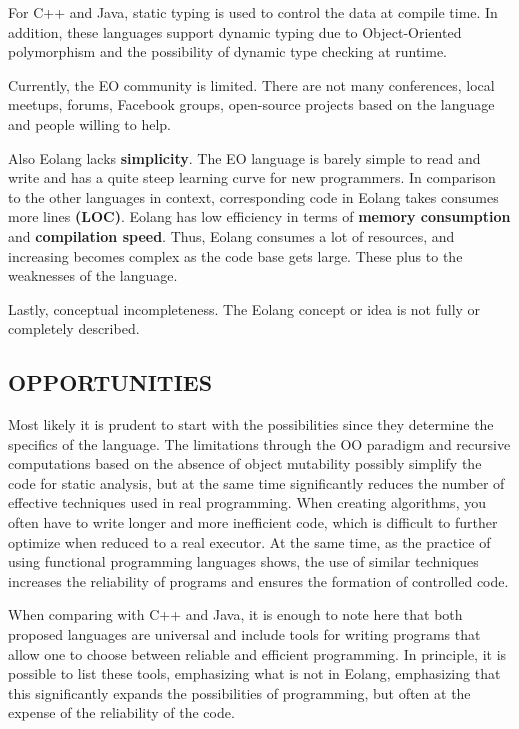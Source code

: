 \documentclass[12pt]{book}
\begin{document}
{{For C++ and Java, static typing is used to control the data at compile time. In addition, these languages support dynamic typing due to Object-Oriented polymorphism and the possibility of dynamic type checking at runtime.

Currently, the EO community is limited. There are not many conferences, local meetups, forums, Facebook groups, open-source projects based on the language and people willing to help. 

Also Eolang lacks \textbf{simplicity}. The EO language is barely simple to read and write and has a quite steep learning curve for new programmers. In comparison to the other languages in context, corresponding code in Eolang takes consumes more lines \textbf{(LOC)}. Eolang has low efficiency in terms of \textbf{memory consumption} and \textbf{compilation speed}. Thus, Eolang consumes a lot of resources, and increasing becomes complex as the code base gets large. These plus to the weaknesses of the language.

Lastly, conceptual incompleteness. The Eolang concept or idea is not fully or completely described.

\subsection{OPPORTUNITIES}
Most likely it is prudent to start with the possibilities since they determine the specifics of the language. The limitations through the OO paradigm and recursive computations based on the absence of object mutability possibly simplify the code for static analysis, but at the same time significantly reduces the number of effective techniques used in real programming. When creating algorithms, you often have to write longer and more inefficient code, which is difficult to further optimize when reduced to a real executor. At the same time, as the practice of using functional programming languages shows, the use of similar techniques increases the reliability of programs and ensures the formation of controlled code.

When comparing with C++ and Java, it is enough to note here that both proposed languages are universal and include tools for writing programs that allow one to choose between reliable and efficient programming. In principle, it is possible to list these tools, emphasizing what is not in Eolang, emphasizing that this significantly expands the possibilities of programming, but often at the expense of the reliability of the code.

}}
\end{document}
